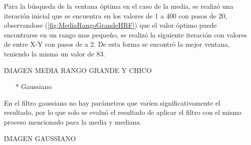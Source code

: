 Para la b\'usqueda de la ventana \'optima en el caso de la media, se realiz\'o una iteraci\'on inicial que se encuentra en los valores de 1 a 400 con pasos de 20, observandose (\ref{fig:MediaRangoGrandeHRF}) que el valor \'optimo puede encontrarse en un rango mas pequeño, se realiz\'o la siguiente iteraci\'on con valores de entre X-Y con pasos de a 2. De esta forma se encontr\'o la mejor ventana, teniendo la misma un valor de 83.

IMAGEN MEDIA RANGO GRANDE Y CHICO

\begin{itemize}
	\item[$*$]Gaussiano
\end{itemize}

En el filtro gaussiano no hay parámetros que varíen significativamente el resultado, por lo que solo se evaluó el resultado de aplicar el filtro con el mismo proceso mencionado para la media y mediana.

IMAGEN GAUSSIANO


